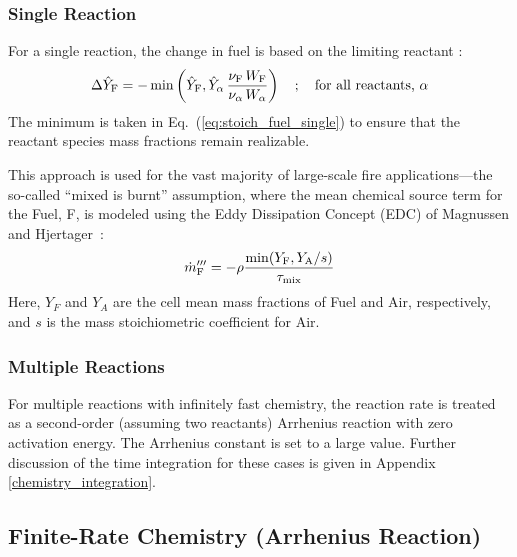 \subsubsection{Single Reaction}

For a single reaction, the change in fuel is based on the limiting reactant \cite{Poinsot:TNC}:
\begin{equation}\label{eq:stoich_fuel_single}
\Delta \hat{Y}_{\rm F} = -\min \left( \hat{Y}_{\rm F}, \hat{Y}_{\alpha} \,\frac{\nu_{\rm F}\,W_{\rm F}}{\nu_{\alpha}\,W_{\alpha}}\right) \quad ; \quad \mbox{for all reactants, $\alpha$}
\end{equation}
The minimum is taken in Eq.~(\ref{eq:stoich_fuel_single}) to ensure that the reactant species mass fractions remain realizable.

This approach is used for the vast majority of large-scale fire applications---the so-called ``mixed is burnt'' assumption, where the mean chemical source term for the Fuel, F, is modeled using the Eddy Dissipation Concept (EDC) of Magnussen and Hjertager~\cite{Magnussen:1,Poinsot:TNC}:
\begin{equation}
\label{eq:edc}
\dot{m}_{\unit{F}}^{\prime\prime\prime} = -\rho \frac{\min(Y_{\unit{F}}, Y_{\unit{A}}/s)}{\tau_{\rm mix}}
\end{equation}
Here, $Y_{\unit{F}}$ and $Y_{\unit{A}}$ are the cell mean mass fractions of Fuel and Air, respectively, and $s$ is the mass stoichiometric coefficient for Air.

\subsubsection{Multiple Reactions}
For multiple reactions with infinitely fast chemistry, the reaction rate is treated as a second-order (assuming two reactants) Arrhenius reaction with zero activation energy.  The Arrhenius constant is set to a large value.  Further discussion of the time integration for these cases is given in Appendix \ref{chemistry_integration}.


\subsection{Finite-Rate Chemistry (Arrhenius Reaction)}
\label{Reaction_Rate_Model}

